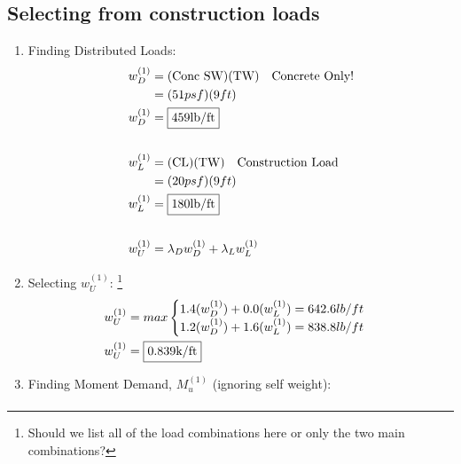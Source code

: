 \documentclass{report} %
\begin{document}
\subsection*{Selecting from construction loads}
\begin{enumerate}
    \item Finding Distributed Loads:
        \begin{equation*}
            \begin{aligned}
                w^{(1)}_D &= (\text{Conc SW}) (\text{TW}) \quad \text{Concrete Only!}\\
                          &= (51psf)(9ft) \\
                w^{(1)}_D &= \framebox{459lb/ft} \\
                \\
                w^{(1)}_L &= (\text{CL}) (\text{TW}) \quad \text{Construction Load}\\
                          &= (20psf)(9ft) \\
                w^{(1)}_L &= \framebox{180lb/ft} \\
                \\
                w^{(1)}_U &= \lambda _D w^{(1)}_D + \lambda _L w^{(1)}_L \\
            \end{aligned}
        \end{equation*}
    \item Selecting $w^{(1)}_U$: \footnote{Should we list all of the load combinations here or only the two main combinations?} 
        \begin{equation*}
            \begin{aligned}
                w^{(1)}_U &= max
                    \begin{cases}
                        1.4(w^{(1)}_D) + 0.0(w^{(1)}_L) = 642.6lb/ft \\
                        1.2(w^{(1)}_D) + 1.6(w^{(1)}_L) = 838.8lb/ft \\
                    \end{cases} \\
                w^{(1)}_U &= \framebox{0.839k/ft}
            \end{aligned}
        \end{equation*}
    \item Finding Moment Demand, $M^{(1)}_u$ (ignoring self weight):
        \begin{equation*}
            \begin{aligned}

\end{aligned}
\end{equation*}
\end{enumerate}
\end{document}
